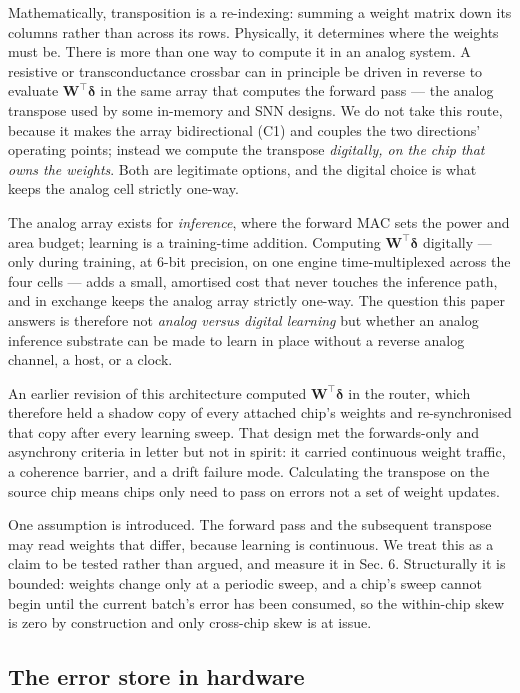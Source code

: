 \documentclass[11pt]{article}
\begin{document}
Mathematically, transposition is a re-indexing: summing a weight matrix
down its columns rather than across its rows. Physically, it determines
where the weights must be. There is more than one way to compute it in
an analog system. A resistive or transconductance crossbar can in
principle be driven in reverse to evaluate \(\bm W^{\!\top}\bm\delta\)
in the same array that computes the forward pass --- the analog
transpose used by some in-memory and SNN designs. We do not take this
route, because it makes the array bidirectional (C1) and couples the two
directions' operating points; instead we compute the transpose
\emph{digitally, on the chip that owns the weights}. Both are legitimate
options, and the digital choice is what keeps the analog cell strictly
one-way.

The analog array exists for \emph{inference}, where the forward MAC sets
the power and area budget; learning is a training-time addition.
Computing \(\bm W^{\!\top}\bm\delta\) digitally --- only during
training, at 6-bit precision, on one engine time-multiplexed across the
four cells --- adds a small, amortised cost that never touches the
inference path, and in exchange keeps the analog array strictly one-way.
The question this paper answers is therefore not \emph{analog versus
digital learning} but whether an analog inference substrate can be made
to learn in place without a reverse analog channel, a host, or a clock.

An earlier revision of this architecture computed
\(\bm W^{\!\top}\bm\delta\) in the router, which therefore held a shadow
copy of every attached chip's weights and re-synchronised that copy
after every learning sweep. That design met the forwards-only and
asynchrony criteria in letter but not in spirit: it carried continuous
weight traffic, a coherence barrier, and a drift failure mode.
Calculating the transpose on the source chip means chips only need to
pass on errors not a set of weight updates.

One assumption is introduced. The forward pass and the subsequent
transpose may read weights that differ, because learning is continuous.
We treat this as a claim to be tested rather than argued, and measure it
in Sec. 6. Structurally it is bounded: weights change only at a periodic
sweep, and a chip's sweep cannot begin until the current batch's error
has been consumed, so the within-chip skew is zero by construction and
only cross-chip skew is at issue.

\hypertarget{sec:jughw}{%
\subsection{The error store in hardware}\label{sec:jughw}}
\end{document}
